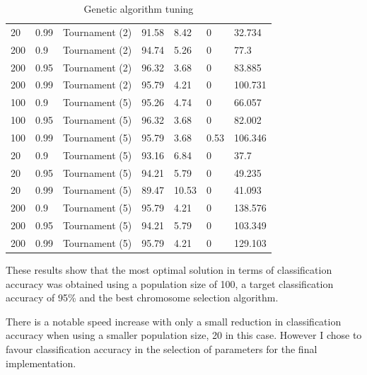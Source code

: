 \documentclass[a4paper]{article}
\begin{document}
\begin{table}[h!]
\begin{tabular}{@{}lllllll@{}}
    20              & 0.99        & Tournament (2) & 91.58         & 8.42       & 0                 & 32.734   \\
    200             & 0.9         & Tournament (2) & 94.74         & 5.26       & 0                 & 77.3     \\
    200             & 0.95        & Tournament (2) & 96.32         & 3.68       & 0                 & 83.885   \\
    200             & 0.99        & Tournament (2) & 95.79         & 4.21       & 0                 & 100.731  \\
    100             & 0.9         & Tournament (5) & 95.26         & 4.74       & 0                 & 66.057   \\
    100             & 0.95        & Tournament (5) & 96.32         & 3.68       & 0                 & 82.002   \\
    100             & 0.99        & Tournament (5) & 95.79         & 3.68       & 0.53              & 106.346  \\
    20              & 0.9         & Tournament (5) & 93.16         & 6.84       & 0                 & 37.7     \\
    20              & 0.95        & Tournament (5) & 94.21         & 5.79       & 0                 & 49.235   \\
    20              & 0.99        & Tournament (5) & 89.47         & 10.53      & 0                 & 41.093   \\
    200             & 0.9         & Tournament (5) & 95.79         & 4.21       & 0                 & 138.576  \\
    200             & 0.95        & Tournament (5) & 94.21         & 5.79       & 0                 & 103.349  \\
    200             & 0.99        & Tournament (5) & 95.79         & 4.21       & 0                 & 129.103  \\
    \bottomrule
  \end{tabular}
  \caption{Genetic algorithm tuning}
  \label{tab:ga_tuning}
\end{table}

These results show that the most optimal solution in terms of classification
accuracy was obtained using a population size of 100, a target classification
accuracy of 95\% and the best chromosome selection algorithm.

There is a notable speed increase with only a small reduction in classification
accuracy when using a smaller population size, 20 in this case. However I chose
to favour classification accuracy in the selection of parameters for the final
implementation.
\end{document}
